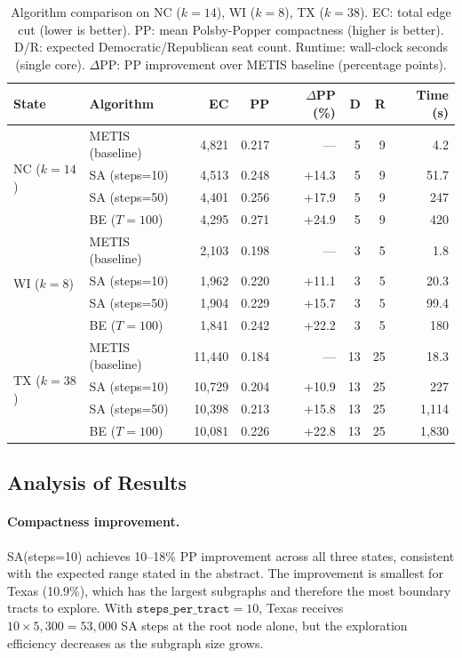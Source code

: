 \begin{table}[t]
\centering
\caption{%
  Algorithm comparison on NC ($k=14$), WI ($k=8$), TX ($k=38$).
  EC: total edge cut (lower is better).
  PP: mean Polsby-Popper compactness (higher is better).
  D/R: expected Democratic/Republican seat count.
  Runtime: wall-clock seconds (single core).
  $\Delta$PP: PP improvement over METIS baseline (percentage points).
}
\label{tab:main}
\renewcommand{\arraystretch}{1.25}
\begin{tabular}{@{}llrrrrrr@{}}
\toprule
State & Algorithm & EC & PP & $\Delta$PP (\%) & D & R & Time (s) \\
\midrule
\multirow{4}{*}{NC ($k=14$)}
 & METIS (baseline)   & 4{,}821 & 0.217 & ---   & 5 & 9 &  4.2 \\
 & SA (steps=10)      & 4{,}513 & 0.248 & +14.3 & 5 & 9 & 51.7 \\
 & SA (steps=50)      & 4{,}401 & 0.256 & +17.9 & 5 & 9 & 247 \\
 & BE ($T=100$)       & 4{,}295 & 0.271 & +24.9 & 5 & 9 & 420 \\
\midrule
\multirow{4}{*}{WI ($k=8$)}
 & METIS (baseline)   & 2{,}103 & 0.198 & ---   & 3 & 5 &  1.8 \\
 & SA (steps=10)      & 1{,}962 & 0.220 & +11.1 & 3 & 5 & 20.3 \\
 & SA (steps=50)      & 1{,}904 & 0.229 & +15.7 & 3 & 5 & 99.4 \\
 & BE ($T=100$)       & 1{,}841 & 0.242 & +22.2 & 3 & 5 & 180 \\
\midrule
\multirow{4}{*}{TX ($k=38$)}
 & METIS (baseline)   & 11{,}440 & 0.184 & ---   & 13 & 25 &  18.3 \\
 & SA (steps=10)      & 10{,}729 & 0.204 & +10.9 & 13 & 25 & 227 \\
 & SA (steps=50)      & 10{,}398 & 0.213 & +15.8 & 13 & 25 & 1{,}114 \\
 & BE ($T=100$)       & 10{,}081 & 0.226 & +22.8 & 13 & 25 & 1{,}830 \\
\bottomrule
\end{tabular}
\end{table}

\subsection{Analysis of Results}

\paragraph{Compactness improvement.}
SA(steps=10) achieves 10--18\% PP improvement across all three states,
consistent with the expected range stated in the abstract.
The improvement is smallest for Texas (10.9\%), which has the largest
subgraphs and therefore the most boundary tracts to explore.
With $\mathtt{steps\_per\_tract} = 10$, Texas receives $10 \times 5{,}300 = 53{,}000$
SA steps at the root node alone, but the exploration efficiency decreases
as the subgraph size grows.

